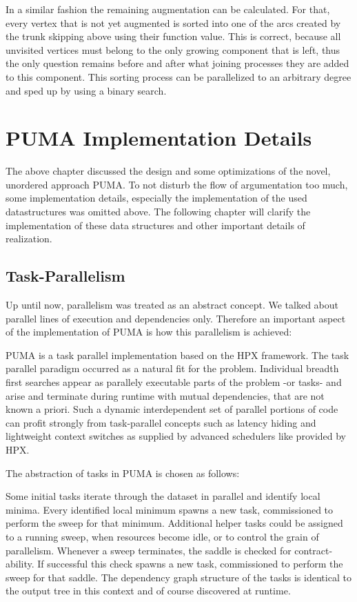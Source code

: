 \documentclass[%
	paper=A4,					%
	twoside=true,				%
	openright,					%
	parskip=full,				%
	chapterprefix=true,			%
	11pt,						%
	headings=normal,			%
	bibliography=totoc,			%
	listof=totoc,				%
	titlepage=on,				%
	captions=tableabove,		%
	draft=false,				%
]{scrreprt}%
\begin{document}
In a similar fashion the remaining augmentation can be calculated. For that, every vertex that is not yet augmented is sorted into one of the arcs created by the trunk skipping above using their function value. This is correct, because all unvisited vertices must belong to the only growing component that is left, thus the only question remains before and after what joining processes they are added to this component. This sorting process can be parallelized to an arbitrary degree and sped up by using a binary search.


\chapter{PUMA Implementation Details}
The above chapter discussed the design and some optimizations of the novel, unordered approach PUMA. To not disturb the flow of argumentation too much, some implementation details, especially the implementation of the used datastructures was omitted above. The following chapter will clarify the implementation of these data structures and other important details of realization. 

\section{Task-Parallelism}
Up until now, parallelism was treated as an abstract concept. We talked about parallel lines of execution and dependencies only. Therefore an important aspect of the implementation of PUMA is how this parallelism is achieved:

PUMA is a task parallel implementation based on the HPX framework. The task parallel paradigm occurred as a natural fit for the problem. Individual breadth first searches appear as parallely executable parts of the problem -or tasks- and arise and terminate during runtime with mutual dependencies, that are not known a priori. Such a dynamic interdependent set of parallel portions of code can profit strongly from task-parallel concepts such as latency hiding and lightweight context switches as supplied by advanced schedulers like provided by HPX. 

The abstraction of tasks in PUMA is chosen as follows:

Some initial tasks iterate through the dataset in parallel and identify local minima. Every identified local minimum spawns a new task, commissioned to perform the sweep for that minimum. Additional helper tasks could be assigned to a running sweep, when resources become idle, or to control the grain of parallelism. Whenever a sweep terminates, the saddle is checked for contract-ability. If successful this check spawns a new task, commissioned to perform the sweep for that saddle. The dependency graph structure of the tasks is identical to the output tree in this context and of course discovered at runtime.
\end{document}
